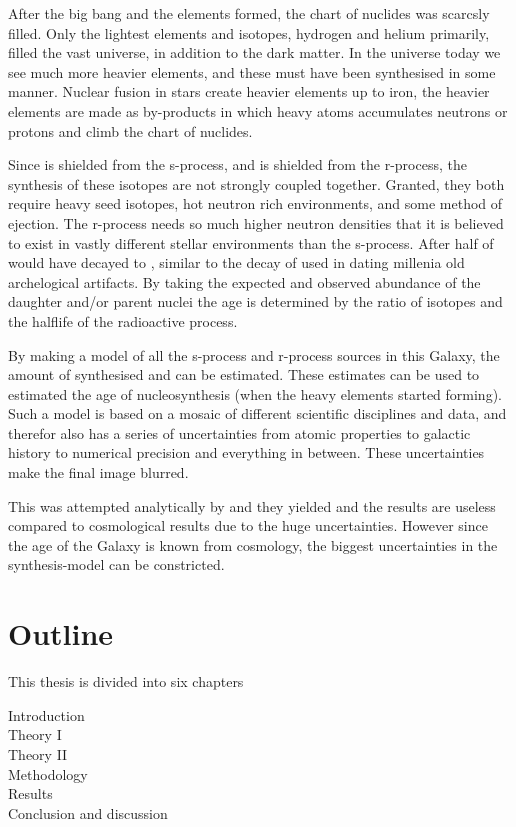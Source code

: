 
After the big bang and the elements formed, the chart of nuclides was scarcsly filled.
Only the lightest elements and isotopes, hydrogen and helium primarily, filled the vast universe\cite{alphabetagamma}, in addition to the dark matter.
In the universe today we see much more heavier elements, and these must have been synthesised in some manner.
Nuclear fusion in stars create heavier elements up to iron, the heavier elements are made as by-products in which heavy atoms accumulates neutrons or protons and climb the chart of nuclides\cite{BBFH}.

Since  is shielded from the s-process, and  is shielded from the r-process, the synthesis of these isotopes are not
strongly coupled together. Granted, they both require heavy seed isotopes, hot neutron rich environments, and some method of ejection. The r-process needs so much higher neutron densities that it is believed to exist in vastly different stellar environments than the s-process.
After  half of  would have decayed to , similar to the decay of  used in dating millenia old archelogical artifacts.
By taking the expected and observed abundance of the daughter and/or parent nuclei the age is determined by the ratio of isotopes and the halflife of the radioactive process.

By making a model of all the s-process and r-process sources in this Galaxy, the amount of synthesised  and  can be estimated. These estimates can be used to estimated the age of nucleosynthesis (when the heavy elements started forming).
Such a model is based on a mosaic of different scientific disciplines and data, and therefor also has a series of uncertainties from atomic properties to galactic history to numerical precision and everything in between. These uncertainties make the final image blurred.

This was attempted analytically by  and they yielded  and the results are useless compared to cosmological results  due to the huge uncertainties. However since the age of the Galaxy is known from cosmology, the biggest uncertainties in the synthesis-model can be constricted.

\section{Outline}

This thesis is divided into six chapters
\begin{description}
\item[Introduction]
\item[Theory I]
\item[Theory II]
\item[Methodology]
\item[Results]
\item[Conclusion and discussion]
\end{description}

